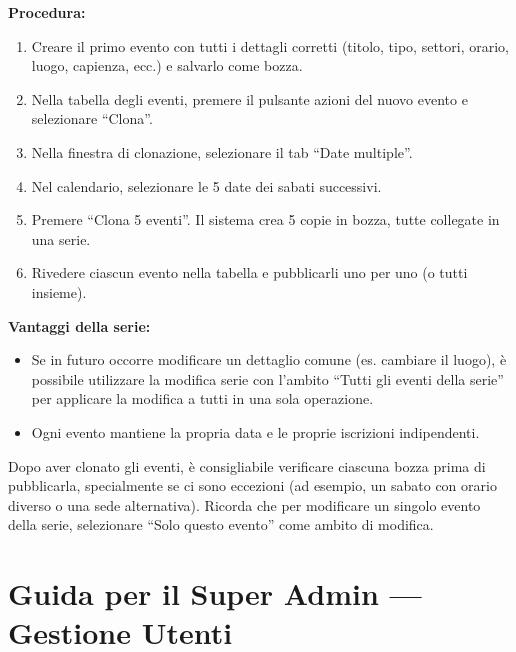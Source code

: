 \documentclass[a4paper,11pt,oneside]{book}
\begin{document}
\textbf{Procedura:}
\begin{enumerate}[leftmargin=1.5em]
  \item Creare il primo evento con tutti i dettagli corretti (titolo, tipo, settori, orario, luogo, capienza, ecc.) e salvarlo come bozza.
  \item Nella tabella degli eventi, premere il pulsante azioni del nuovo evento e selezionare ``Clona''.
  \item Nella finestra di clonazione, selezionare il tab ``Date multiple''.
  \item Nel calendario, selezionare le 5 date dei sabati successivi.
  \item Premere ``Clona 5 eventi''. Il sistema crea 5 copie in bozza, tutte collegate in una serie.
  \item Rivedere ciascun evento nella tabella e pubblicarli uno per uno (o tutti insieme).
\end{enumerate}

\textbf{Vantaggi della serie:}
\begin{itemize}[leftmargin=1.5em]
  \item Se in futuro occorre modificare un dettaglio comune (es. cambiare il luogo), \`e possibile utilizzare la modifica serie con l'ambito ``Tutti gli eventi della serie'' per applicare la modifica a tutti in una sola operazione.
  \item Ogni evento mantiene la propria data e le proprie iscrizioni indipendenti.
\end{itemize}

\begin{tipbox}
Dopo aver clonato gli eventi, \`e consigliabile verificare ciascuna bozza prima di pubblicarla, specialmente se ci sono eccezioni (ad esempio, un sabato con orario diverso o una sede alternativa). Ricorda che per modificare un singolo evento della serie, selezionare ``Solo questo evento'' come ambito di modifica.
\end{tipbox}


\chapter{Guida per il Super Admin --- Gestione Utenti}
\label{ch:admin-utenti}
\end{document}
